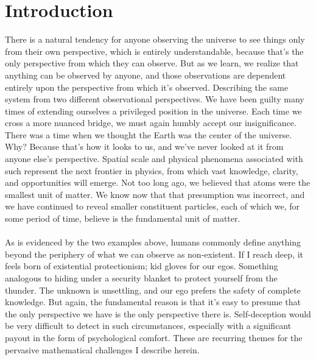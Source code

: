 \documentclass[twoside,twocolumn,9pt]{article}
\begin{document}
\section{Introduction}
There is a natural tendency for anyone observing the universe to see things only from their own perspective, which is entirely understandable, because that's the only perspective from which they can observe. But as we learn, we realize that anything can be observed by anyone, and those observations are dependent entirely upon the perspective from which it's observed. Describing the same system from two different observational perspectives. We have been guilty many times of extending ourselves a privileged position in the universe. Each time we cross a more nuanced bridge, we must again humbly accept our insignificance. There was a time when we thought the Earth was the center of the universe. Why? Because that's how it looks to us, and we've never looked at it from anyone else's perspective. Spatial scale and physical phenomena associated with such represent the next frontier in physics, from which vast knowledge, clarity, and opportunities will emerge. Not too long ago, we believed that atoms were the smallest unit of matter. We know now that that presumption was incorrect, and we have continued to reveal smaller constituent particles, each of which we, for some period of time, believe is the fundamental unit of matter.\\
\\
As is evidenced by the two examples above, humans commonly define anything beyond the periphery of what we can observe as non-existent. If I reach deep, it feels born of existential protectionism; kid gloves for our egos. Something analogous to hiding under a security blanket to protect yourself from the thunder. The unknown is unsettling, and our ego prefers the safety of complete knowledge. But again, the fundamental reason is that it's easy to presume that the only perspective we have is the only perspective there is. Self-deception would be very difficult to detect in such circumstances, especially with a significant payout in the form of psychological comfort. These are recurring themes for the pervasive mathematical challenges I describe herein.
\end{document}
